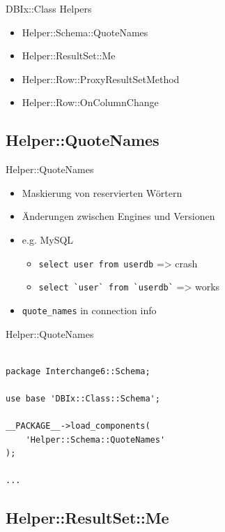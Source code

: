 
\begin{frame}{DBIx::Class Helpers}
\begin{itemize}
\item Helper::Schema::QuoteNames
\item Helper::ResultSet::Me
\item Helper::Row::ProxyResultSetMethod
\item Helper::Row::OnColumnChange
\end{itemize}
\end{frame}

\subsection{Helper::QuoteNames}

\begin{frame}[fragile]{Helper::QuoteNames}
\begin{itemize}
\item Maskierung von reservierten Wörtern
\item Änderungen zwischen Engines und Versionen
\item e.g. MySQL
\begin{itemize}
\item \verb|select user from userdb| => crash
\item \verb|select `user` from `userdb`| => works
\end{itemize}
\item \verb|quote_names| in connection info
\end{itemize}
\end{frame}

\begin{frame}[fragile]{Helper::QuoteNames}
\begin{lstlisting}

package Interchange6::Schema;

use base 'DBIx::Class::Schema';

__PACKAGE__->load_components( 
    'Helper::Schema::QuoteNames' 
);

...

\end{lstlisting}
\end{frame}

\subsection{Helper::ResultSet::Me}

